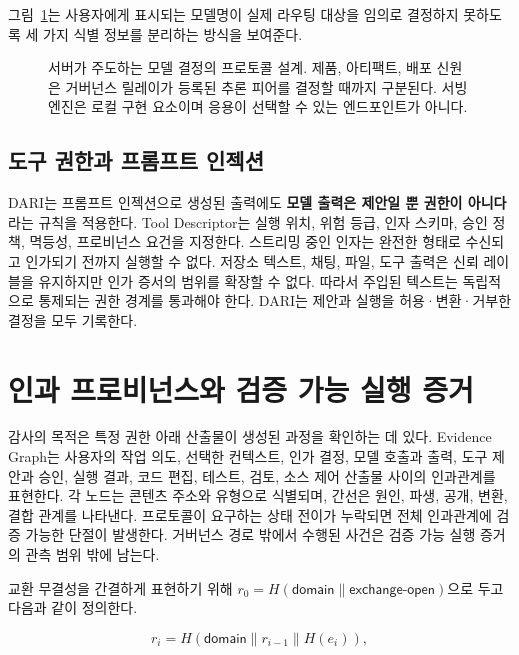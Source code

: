 \documentclass[10pt]{article}
\renewcommand{\emph}[1]{\textbf{#1}}
\begin{document}
그림~\ref{fig:model-identity}는 사용자에게 표시되는 모델명이 실제 라우팅 대상을 임의로 결정하지 못하도록 세 가지 식별 정보를 분리하는 방식을 보여준다.

\begin{figure}[H]
  \centering
  
  \caption{서버가 주도하는 모델 결정의 프로토콜 설계. 제품, 아티팩트, 배포 신원은 거버넌스 릴레이가 등록된 추론 피어를 결정할 때까지 구분된다. 서빙 엔진은 로컬 구현 요소이며 응용이 선택할 수 있는 엔드포인트가 아니다.}
  \label{fig:model-identity}
\end{figure}

\subsection{도구 권한과 프롬프트 인젝션}

DARI는 프롬프트 인젝션으로 생성된 출력에도 \emph{모델 출력은 제안일 뿐 권한이 아니다}라는 규칙을 적용한다. Tool Descriptor는 실행 위치, 위험 등급, 인자 스키마, 승인 정책, 멱등성, 프로비넌스 요건을 지정한다. 스트리밍 중인 인자는 완전한 형태로 수신되고 인가되기 전까지 실행할 수 없다. 저장소 텍스트, 채팅, 파일, 도구 출력은 신뢰 레이블을 유지하지만 인가 증서의 범위를 확장할 수 없다. 따라서 주입된 텍스트는 독립적으로 통제되는 권한 경계를 통과해야 한다. DARI는 제안과 실행을 허용·변환·거부한 결정을 모두 기록한다.

\section{인과 프로비넌스와 검증 가능 실행 증거}

감사의 목적은 특정 권한 아래 산출물이 생성된 과정을 확인하는 데 있다. Evidence Graph는 사용자의 작업 의도, 선택한 컨텍스트, 인가 결정, 모델 호출과 출력, 도구 제안과 승인, 실행 결과, 코드 편집, 테스트, 검토, 소스 제어 산출물 사이의 인과관계를 표현한다. 각 노드는 콘텐츠 주소와 유형으로 식별되며, 간선은 원인, 파생, 공개, 변환, 결합 관계를 나타낸다. 프로토콜이 요구하는 상태 전이가 누락되면 전체 인과관계에 검증 가능한 단절이 발생한다. 거버넌스 경로 밖에서 수행된 사건은 검증 가능 실행 증거의 관측 범위 밖에 남는다.

교환 무결성을 간결하게 표현하기 위해 $r_0=H(\textsf{domain}\parallel\textsf{exchange-open})$으로 두고 다음과 같이 정의한다.

\begin{equation}
r_i = H(\textsf{domain}\parallel r_{i-1}\parallel H(e_i)),
\end{equation}
\end{document}
